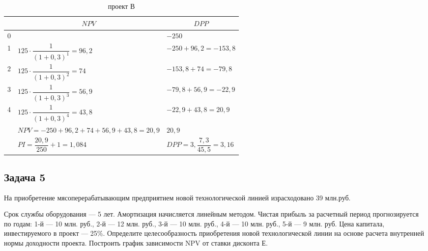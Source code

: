 \begin{table}[!h]
	\caption{проект В}
	\small
	\setlength{\extrarowheight}{2.7mm}
	\begin{tabularx}{\textwidth}{|K{1.55cm}|p{5cm}|p{5cm}|}
		\hline
		&                       &  \\  &                                                                    &  $    -250   $                 \\  & $125 \cdot \dfrac{1}{(1+0,3)^1} = 96,2$  &$ -250 +96,2   =-153,8     $            \\  & $125 \cdot \dfrac{1}{(1+0,3)^2} = 74$ & $-153,8  +74=-79,8      $           \\  & $125 \cdot \dfrac{1}{(1+0,3)^3} = 56,9$ &$-79,8  +56,9=-22,9    $             \\  & $125 \cdot \dfrac{1}{(1+0,3)^4} =43,8$  & $-22,9 +43,8= 20,9     $                \\ \hline
		&$NPV = -250+96,2+74+56,9+43,8=20,9$     & $20,9 $                     \\ \hline
		&$PI = \dfrac{20,9}{250}+1=1,084$                                        & $DPP = 3,\dfrac{7,3}{45,5}=3,16$                 \\ \hline
	\end{tabularx}
\end{table}








\subsection{Задача 5}
На приобретение мясоперерабатывающим предприятием новой технологической линией израсходовано 39 млн.руб.

Срок службы оборудования --- 5 лет. Амортизация начисляется линейным методом. Чистая прибыль за расчетный период прогнозируется по годам: 1-й --- 10 млн. руб., 2-й --- 12 млн. руб., 3-й --- 10 млн. руб., 4-й --- 10 млн. руб., 5-й --- 9 млн. руб. Цена капитала, инвестируемого в проект --- 25\%. Определите целесообразность приобретения новой  технологической линии на основе расчета внутренней нормы доходности проекта. Построить график зависимости NPV от ставки дисконта Е.